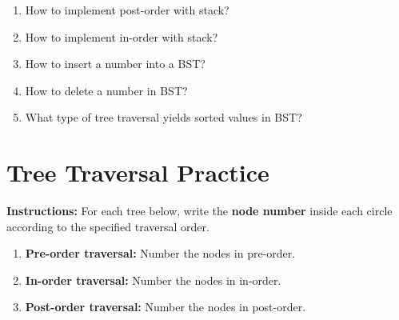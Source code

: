 \documentclass[11pt, letterpaper]{article}
\begin{document}
\begin{enumerate}[leftmargin=*, label=\textbf{\arabic*.}]
  \item How to implement post-order with stack?
    \begin{answerspace}
    \end{answerspace}

  \item How to implement in-order with stack?
    \begin{answerspace}
    \end{answerspace}

  \item How to insert a number into a BST?
    \begin{answerspace}
    \end{answerspace}

  \item How to delete a number in BST?
    \begin{answerspace}
    \end{answerspace}

  \item What type of tree traversal yields sorted values in BST?
    \begin{answerspace}
    \end{answerspace}

\end{enumerate}
\clearpage
\section*{Tree Traversal Practice}

\noindent\textbf{Instructions:}  
For each tree below, write the \textbf{node number} inside each circle according to the specified traversal order.

\vspace{1em}

\begin{enumerate}[leftmargin=*]
  \item \textbf{Pre-order traversal:} Number the nodes in pre-order.
  \item \textbf{In-order traversal:} Number the nodes in in-order.
  \item \textbf{Post-order traversal:} Number the nodes in post-order.
\end{enumerate}

\vspace{2em}

\newcommand{\binarytree}{
\begin{center}
\begin{tikzpicture}[level distance=1.7cm,
  level 1/.style={sibling distance=5cm},
  level 2/.style={sibling distance=2cm},
  every node/.append style={circle,draw,minimum size=1cm, font=\large, fill=white, text=black},
  edge from parent/.style={draw,thick}]
\node {} %
  child { node {} 
    child { node {} 
      child[missing]
      child { node {} } 
    }
    child { node {} } 
  }
  child { node {} 
    child { node {} } 
    child { node {} 
      child { node {} } 
      child { node {} } 
    }
  };
\end{tikzpicture}
\end{center}
}
\end{document}
